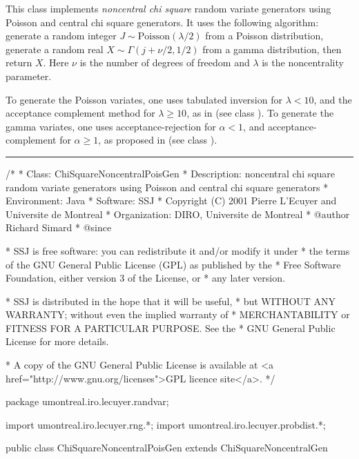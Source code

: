 
This class implements {\em noncentral chi square\/} random variate generators
using Poisson and central chi square generators. It uses the following algorithm:
generate a random integer $J \sim \mbox{Poisson}(\lambda/2)$ from a Poisson
distribution, generate a random real $X \sim \Gamma(j + \nu/2, 1/2)$ from a
gamma distribution, then return $X$.
Here $\nu$ is the number of degrees of freedom and
$\lambda$ is the noncentrality parameter.

To generate the Poisson variates, one
uses tabulated inversion for $\lambda<10$, and the acceptance complement
method for $\lambda \ge 10$, as in \cite{rAHR82b}
(see class ).
To generate the gamma variates, one
uses acceptance-rejection for $\alpha<1$, and acceptance-complement
for $\alpha\ge 1$, as proposed  in \cite{rAHR72b,rAHR82a}
(see class ).

\bigskip\hrule

\begin{code}
\begin{hide}
/*
 * Class:        ChiSquareNoncentralPoisGen
 * Description:  noncentral chi square random variate generators using Poisson
                 and central chi square generators
 * Environment:  Java
 * Software:     SSJ
 * Copyright (C) 2001  Pierre L'Ecuyer and Universite de Montreal
 * Organization: DIRO, Universite de Montreal
 * @author       Richard Simard
 * @since

 * SSJ is free software: you can redistribute it and/or modify it under
 * the terms of the GNU General Public License (GPL) as published by the
 * Free Software Foundation, either version 3 of the License, or
 * any later version.

 * SSJ is distributed in the hope that it will be useful,
 * but WITHOUT ANY WARRANTY; without even the implied warranty of
 * MERCHANTABILITY or FITNESS FOR A PARTICULAR PURPOSE.  See the
 * GNU General Public License for more details.

 * A copy of the GNU General Public License is available at
   <a href="http://www.gnu.org/licenses">GPL licence site</a>.
 */
\end{hide}
package umontreal.iro.lecuyer.randvar;\begin{hide}
import umontreal.iro.lecuyer.rng.*;
import umontreal.iro.lecuyer.probdist.*;
\end{hide}

public class ChiSquareNoncentralPoisGen extends ChiSquareNoncentralGen \begin{hide} {
\end{hide}\end{code}

